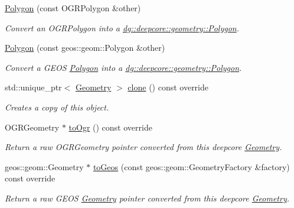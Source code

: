 \begin{DoxyCompactItemize}
\hyperlink{structdg_1_1deepcore_1_1geometry_1_1_polygon_a419027a80d29cb78e32144057713649c}{Polygon} (const O\+G\+R\+Polygon \&other)
\begin{DoxyCompactList}\small\item\em Convert an O\+G\+R\+Polygon into a \hyperlink{structdg_1_1deepcore_1_1geometry_1_1_polygon}{dg\+::deepcore\+::geometry\+::\+Polygon}. \end{DoxyCompactList}\item 
\hyperlink{structdg_1_1deepcore_1_1geometry_1_1_polygon_a4e1a22fbd7f6f07d9a9ef26fbde52224}{Polygon} (const geos\+::geom\+::\+Polygon \&other)
\begin{DoxyCompactList}\small\item\em Convert a G\+E\+OS \hyperlink{structdg_1_1deepcore_1_1geometry_1_1_polygon}{Polygon} into a \hyperlink{structdg_1_1deepcore_1_1geometry_1_1_polygon}{dg\+::deepcore\+::geometry\+::\+Polygon}. \end{DoxyCompactList}\item 
std\+::unique\+\_\+ptr$<$ \hyperlink{structdg_1_1deepcore_1_1geometry_1_1_geometry}{Geometry} $>$ \hyperlink{structdg_1_1deepcore_1_1geometry_1_1_polygon_a4b6ab74c5cbc5dd52f9b4d416120d98c}{clone} () const override
\begin{DoxyCompactList}\small\item\em Creates a copy of this object. \end{DoxyCompactList}\item 
O\+G\+R\+Geometry $\ast$ \hyperlink{structdg_1_1deepcore_1_1geometry_1_1_polygon_a70583e034761cb90daf62f5653212773}{to\+Ogr} () const override
\begin{DoxyCompactList}\small\item\em Return a raw O\+G\+R\+Geometry pointer converted from this deepcore \hyperlink{structdg_1_1deepcore_1_1geometry_1_1_geometry}{Geometry}. \end{DoxyCompactList}\item 
geos\+::geom\+::\+Geometry $\ast$ \hyperlink{structdg_1_1deepcore_1_1geometry_1_1_polygon_aba570d5f40f470167e0c552d30c8ea69}{to\+Geos} (const geos\+::geom\+::\+Geometry\+Factory \&factory) const override
\begin{DoxyCompactList}\small\item\em Return a raw G\+E\+OS \hyperlink{structdg_1_1deepcore_1_1geometry_1_1_geometry}{Geometry} pointer converted from this deepcore \hyperlink{structdg_1_1deepcore_1_1geometry_1_1_geometry}{Geometry}. \end{DoxyCompactList}\item 

\end{DoxyCompactItemize}
